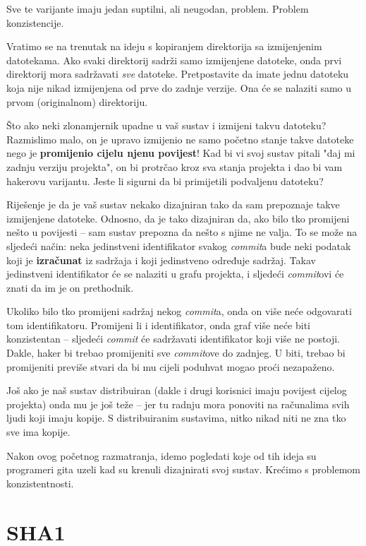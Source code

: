 Sve te varijante imaju jedan suptilni, ali neugodan, problem.
Problem konzistencije.

Vratimo se na trenutak na ideju s kopiranjem direktorija sa izmijenjenim datotekama.
Ako svaki direktorij sadrži samo izmijenjene datoteke, onda prvi direktorij mora sadržavati \emph{sve} datoteke.
Pretpostavite da imate jednu datoteku koja nije nikad izmijenjena od prve do zadnje verzije. 
Ona će se nalaziti samo u prvom (originalnom) direktoriju.

Što ako neki zlonamjernik upadne u vaš sustav i izmijeni takvu datoteku?
Razmislimo malo, on je upravo izmijenio ne samo početno stanje takve datoteke nego je \textbf{promijenio cijelu njenu povijest}!
Kad bi vi svoj sustav pitali "daj mi zadnju verziju projekta", on bi protrčao kroz sva stanja projekta i dao bi vam hakerovu varijantu.
Jeste li sigurni da bi primijetili podvaljenu datoteku?

Riješenje je da je vaš sustav nekako dizajniran tako da sam prepoznaje takve izmijenjene datoteke. 
Odnosno, da je tako dizajniran da, ako bilo tko promijeni nešto u povijesti -- sam sustav prepozna da nešto s njime ne valja.
To se može na sljedeći način: neka jedinstveni identifikator svakog \emph{commit}a bude neki podatak koji je \textbf{izračunat} iz sadržaja i koji jedinstveno određuje sadržaj.
Takav jedinstveni identifikator će se nalaziti u grafu projekta, i sljedeći \emph{commit}ovi će znati da im je on prethodnik.

Ukoliko bilo tko promijeni sadržaj nekog \emph{commit}a, onda on više neće odgovarati tom identifikatoru.
Promijeni li i identifikator, onda graf više neće biti konzistentan -- sljedeći \emph{commit} će sadržavati identifikator koji više ne postoji.
Dakle, haker bi trebao promijeniti sve \emph{commit}ove do zadnjeg. 
U biti, trebao bi promijeniti previše stvari da bi mu cijeli poduhvat mogao proći nezapaženo.

Još ako je naš sustav distribuiran (dakle i drugi korisnici imaju povijest cijelog projekta) onda mu je još teže -- jer tu radnju mora ponoviti na računalima svih ljudi koji imaju kopije.
S distribuiranim sustavima, nitko nikad niti ne zna tko sve ima kopije.

Nakon ovog početnog razmatranja, idemo pogledati koje od tih ideja su programeri gita uzeli kad su krenuli dizajnirati svoj sustav.
Krećimo s problemom konzistentnosti.

\section*{SHA1}

